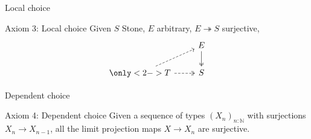 \documentclass{beamer}
\begin{document}
\begin{frame}[fragile]{Local choice}
  \begin{block}{Axiom 3: Local choice}
  Given $S$ Stone, $E$ arbitrary, %
  $E\twoheadrightarrow S$ surjective, 
   \begin{equation*}\begin{tikzcd}
    & E \arrow[d,""',two heads]\\
      \only<2->{
      T \arrow [r, two heads,dashed] \arrow [ur,dashed]
      } 
       & S
    \end{tikzcd}\end{equation*}  
  \end{block}
\end{frame}
\begin{frame}{Dependent choice}
\begin{block}{Axiom 4: Dependent choice}
  Given a sequence of types $(X_n)_{n:\mathbb N}$ with surjections 
  $X_n \to X_{n-1}$, all the limit projection maps $X \to X_n$ are surjective. 
\end{block}
\end{frame}
\end{document}
